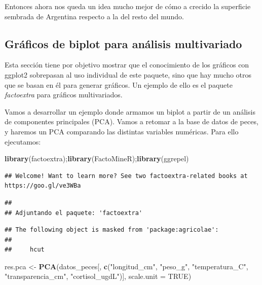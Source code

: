 \documentclass[
]{article}
\newenvironment{Shaded}{\begin{snugshade}}{\end{snugshade}}
\newcommand{\AttributeTok}[1]{\textcolor[rgb]{0.13,0.29,0.53}{#1}}
\newcommand{\ConstantTok}[1]{\textcolor[rgb]{0.56,0.35,0.01}{#1}}
\newcommand{\FunctionTok}[1]{\textcolor[rgb]{0.13,0.29,0.53}{\textbf{#1}}}
\newcommand{\NormalTok}[1]{#1}
\newcommand{\OtherTok}[1]{\textcolor[rgb]{0.56,0.35,0.01}{#1}}
\newcommand{\StringTok}[1]{\textcolor[rgb]{0.31,0.60,0.02}{#1}}
\begin{document}
Entonces ahora nos queda un idea mucho mejor de cómo a crecido la
superficie sembrada de Argentina respecto a la del resto del mundo.

\subsection{Gráficos de biplot para análisis
multivariado}\label{gruxe1ficos-de-biplot-para-anuxe1lisis-multivariado}

Esta sección tiene por objetivo mostrar que el conocimiento de los
gráficos con ggplot2 sobrepasan al uso individual de este paquete, sino
que hay mucho otros que se basan en él para generar gráficos. Un ejemplo
de ello es el paquete \emph{factoextra} para gráficos multivariados.

Vamos a desarrollar un ejemplo donde armamos un biplot a partir de un
análisis de componentes principales (PCA). Vamos a retomar a la base de
datos de peces, y haremos un PCA comparando las distintas variables
numéricas. Para ello ejecutamos:

\begin{Shaded}
\begin{Highlighting}[]
\FunctionTok{library}\NormalTok{(factoextra);}\FunctionTok{library}\NormalTok{(FactoMineR);}\FunctionTok{library}\NormalTok{(ggrepel)}
\end{Highlighting}
\end{Shaded}

\begin{verbatim}
## Welcome! Want to learn more? See two factoextra-related books at https://goo.gl/ve3WBa
\end{verbatim}

\begin{verbatim}
## 
## Adjuntando el paquete: 'factoextra'
\end{verbatim}

\begin{verbatim}
## The following object is masked from 'package:agricolae':
## 
##     hcut
\end{verbatim}

\begin{Shaded}
\begin{Highlighting}[]
\NormalTok{res.pca }\OtherTok{\textless{}{-}} \FunctionTok{PCA}\NormalTok{(datos\_peces[, }\FunctionTok{c}\NormalTok{(}\StringTok{"longitud\_cm"}\NormalTok{, }\StringTok{"peso\_g"}\NormalTok{,}
                               \StringTok{"temperatura\_C"}\NormalTok{, }\StringTok{"transparencia\_cm"}\NormalTok{,}
                               \StringTok{"cortisol\_ugdL"}\NormalTok{)],}
               \AttributeTok{scale.unit =} \ConstantTok{TRUE}\NormalTok{)}
\end{Highlighting}
\end{Shaded}
\end{document}
